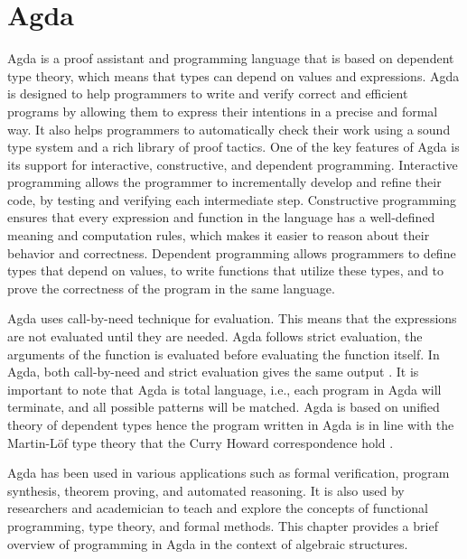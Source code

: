 \chapter{Agda}
Agda is a proof assistant and programming language that is based on dependent
type theory, which means that types can depend on values and expressions. Agda
is designed to help programmers to write and verify correct and efficient programs
by allowing them to express their intentions in a precise and formal way. It
also helps programmers to automatically check their work using a sound type
system and a rich library of proof tactics. One of the key features of Agda is
its support for interactive, constructive, and dependent programming.
Interactive programming allows the programmer to incrementally develop and
refine their code, by testing and verifying each intermediate step. Constructive
programming ensures that every expression and function in the language has a
well-defined meaning and computation rules, which makes it easier to reason
about their behavior and correctness. Dependent programming allows programmers
to define types that depend on values, to write functions that utilize these
types, and to prove the correctness of the program in the same language.

Agda uses call-by-need technique for evaluation. This means that the expressions
are not evaluated until they are needed. Agda follows strict evaluation, the
arguments of the function is evaluated before evaluating the function itself. In
Agda, both call-by-need and strict evaluation gives the same output
\cite{kidney2020finiteness}. It is important to note that Agda is total
language, i.e., each program in Agda will terminate, and all possible patterns
will be matched. Agda is based on unified theory of dependent types
\cite{enwiki:1127496533} hence the program written in Agda is in line with the
Martin-Löf type theory that the Curry Howard correspondence hold
\cite{kidney2020finiteness}.

Agda has been used in various applications such as formal verification, program
synthesis, theorem proving, and automated reasoning. It is also used by
researchers and academician to teach and explore the concepts of functional
programming, type theory, and formal methods. This chapter provides a brief
overview of programming in Agda in the context of algebraic structures. 

